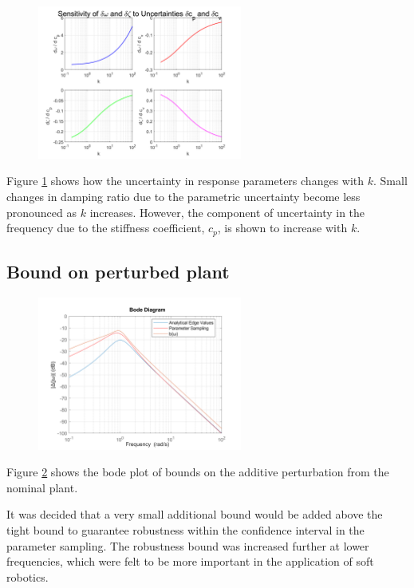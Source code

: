 \documentclass{article}
\begin{document}
\begin{figure}[H]
    \centering
    \includegraphics[width=0.6\textwidth]{figures/u_propagation.png}
    \caption{}
    \label{fig:u_propagation}
\end{figure}
Figure \ref{fig:u_propagation} shows how the uncertainty in response parameters changes with $k$.
Small changes in damping ratio due to the parametric uncertainty become less pronounced as $k$ increases.
However, the component of uncertainty in the frequency due to the stiffness coefficient, $c_p$, is shown to increase with $k$.

\subsection{Bound on perturbed plant}

\begin{figure}[H]
    \centering
    \includegraphics[width=0.6\textwidth]{figures/1_tight_bound.png}
    \caption{}
    \label{fig:bode_Gp}
\end{figure}

Figure \ref{fig:bode_Gp} shows the bode plot of bounds on the additive perturbation from the nominal plant.

It was decided that a very small additional bound would be added above the tight bound to guarantee robustness within the confidence interval in the parameter sampling.
The robustness bound was increased further at lower frequencies, which were felt to be more important in the application of soft robotics.
\end{document}
